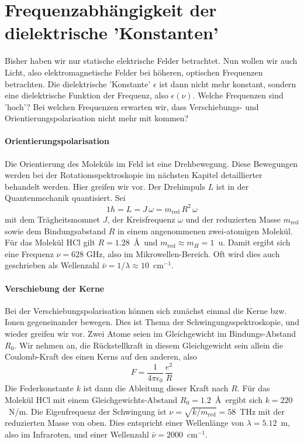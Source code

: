  
\section{Frequenzabhängigkeit der dielektrische 'Konstanten' }
 
Bisher haben wir nur statische elektrische Felder betrachtet. Nun wollen wir auch Licht, also elektromagnetische Felder bei  höheren, optischen Frequenzen  betrachten. Die dielektrische 'Konstante' $\epsilon$ ist dann nicht mehr konstant, sondern eine dielektrische Funktion der Frequenz, also $\epsilon(\nu)$. Welche Frequenzen sind 'hoch'? Bei welchen Frequenzen erwarten wir, dass Verschiebungs- und Orientierungspolarisation nicht mehr mit kommen?

\paragraph{Orientierungspolarisation} Die Orientierung des Moleküls im Feld ist eine Drehbewegung. Diese Bewegungen werden bei der Rotationsspektroskopie im nächsten Kapitel detaillierter behandelt werden. Hier greifen wir vor. Der Drehimpuls $L$ ist in der Quantenmechanik quantisiert. Sei
\begin{equation}
1 \hbar = L = J \, \omega = m_\text{red} \, R^2 \, \omega
\end{equation}
mit dem Trägheitsmomnet $J$, der Kreisfrequenz $\omega$ und der reduzierten Masse 
 $m_\text{red}$ sowie dem Bindungsabstand $R$ in einem angenommenen zwei-atomigen Molekül. Für das Molekül HCl gilt $R = 1.28$~\AA\ und $m_\text{red} \approx m_H = 1$~u. Damit ergibt sich eine Frequenz $\nu = 628$ GHz, also im Mikrowellen-Bereich. Oft wird dies auch geschrieben als Wellenzahl $\bar{\nu} = 1 /\lambda \approx 10$~cm$^{-1}$.
 
\paragraph{Verschiebung der Kerne} Bei der Verschiebungspolarisation können sich zunächst einmal die Kerne bzw. Ionen gegeneinander bewegen. Dies ist Thema der Schwingungsspektroskopie, und wieder greifen wir vor. Zwei Atome seien im Gleichgewicht  im Bindungs-Abstand $R_0$. Wir nehmen an, die Rückstellkraft in diesem Gleichgewicht sein allein die Coulomb-Kraft des einen Kerns auf den anderen, also 
\begin{equation}
F = \frac{1}{4 \pi \epsilon_0} \, \frac{e^2}{R}
\end{equation}
Die Federkonstante $k$ ist dann die Ableitung dieser Kraft nach $R$. Für das Molekül HCl mit einem Gleichgewichts-Abstand $R_0 = 1.2$~\AA\ ergibt sich $k = 220$~N/m. Die Eigenfrequenz der Schwingung  ist $\nu = \sqrt{k/m_\text{red}} = 58$~THz mit der reduzierten Masse von oben. Dies entspricht einer Wellenlänge von $\lambda = 5.12$~\textmu m, also im Infraroten, und einer Wellenzahl $\bar{\nu} = 2000$~cm$^{-1}$.

